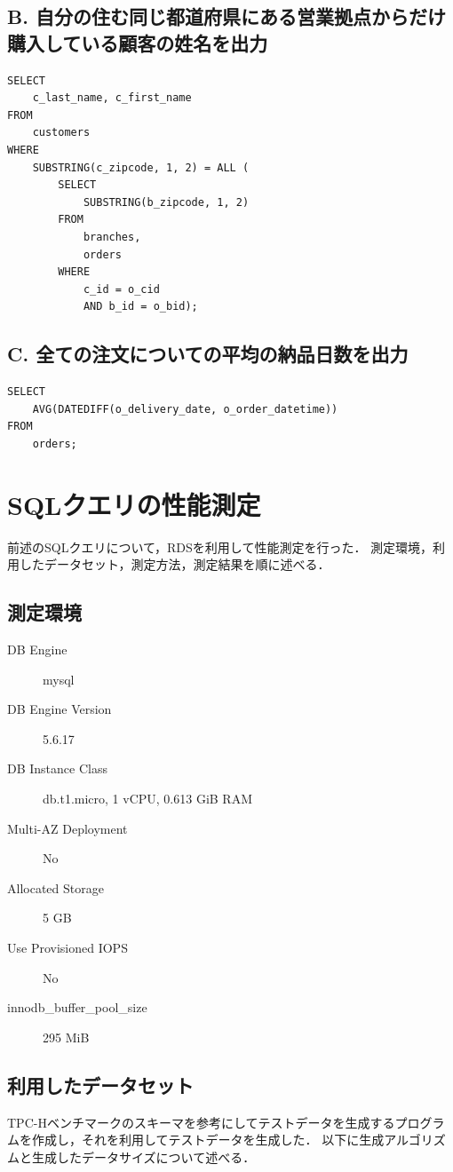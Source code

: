 \documentclass{jsarticle}
\begin{document}
\subsection{B. 自分の住む同じ都道府県にある営業拠点からだけ購入している顧客の姓名を出力}
\begin{lstlisting}[caption=問い合わせBのクエリ, label=q2]
SELECT
    c_last_name, c_first_name
FROM
    customers
WHERE
    SUBSTRING(c_zipcode, 1, 2) = ALL (
        SELECT
            SUBSTRING(b_zipcode, 1, 2)
        FROM
            branches,
            orders
        WHERE
            c_id = o_cid
            AND b_id = o_bid);
\end{lstlisting}

\subsection{C. 全ての注文についての平均の納品日数を出力}
\begin{lstlisting}[caption=問い合わせCのクエリ, label=q3]
SELECT
    AVG(DATEDIFF(o_delivery_date, o_order_datetime))
FROM
    orders;
\end{lstlisting}

\section{SQLクエリの性能測定}
前述のSQLクエリについて，RDSを利用して性能測定を行った．
測定環境，利用したデータセット，測定方法，測定結果を順に述べる．

\subsection{測定環境}
\begin{description}
  \item[DB Engine] mysql
  \item[DB Engine Version] 5.6.17
  \item[DB Instance Class] db.t1.micro, 1 vCPU, 0.613 GiB RAM
  \item[Multi-AZ Deployment] No
  \item[Allocated Storage] 5 GB
  \item[Use Provisioned IOPS] No
  \item[innodb\_buffer\_pool\_size] 295 MiB
\end{description}

\subsection{利用したデータセット}
TPC-Hベンチマーク\cite{tpch}のスキーマを参考にしてテストデータを生成するプログラムを作成し，それを利用してテストデータを生成した．
以下に生成アルゴリズムと生成したデータサイズについて述べる．
\end{document}
